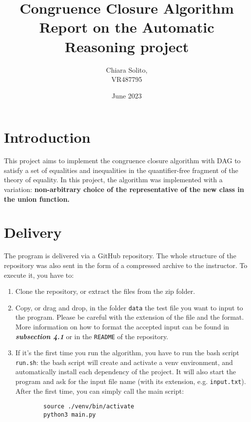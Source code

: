 \documentclass[11pt]{article}
\title{\Huge Congruence Closure Algorithm \\ \Large Report on the Automatic Reasoning project}
\date{June 2023}
\author{Chiara Solito,\\VR487795}
\begin{document}
\maketitle

\section{Introduction}
This project aims to implement the congruence closure algorithm with DAG to satisfy a set of equalities and inequalities in the quantifier-free fragment of the theory of equality. In this project, the algorithm was implemented with a variation: \textbf{non-arbitrary choice of the representative of the new class in the union function.}

\section{Delivery}
The program is delivered via a GitHub repository. The whole structure of the repository was also sent in the form of a compressed archive to the instructor. To execute it, you have to:
\begin{enumerate}
    \item Clone the repository, or extract the files from the zip folder.
    \item Copy, or drag and drop, in the folder \texttt{data} the test file you want to input to the program. Please be careful with the extension of the file and the format. \\ More information on how to format the accepted input can be found in \textit{\textbf{subsection 4.1}} or in the \texttt{README} of the repository.
    \item If it's the first time you run the algorithm, you have to run the bash script \texttt{run.sh}: the bash script will create and activate a venv environment, and automatically install each dependency of the project. It will also start the program and ask for the input file name (with its extension, e.g. \texttt{input.txt}).\\
    After the first time, you can simply call the main script:
    \begin{verbatim}
        source ./venv/bin/activate
        python3 main.py
    \end{verbatim}
    
\end{enumerate}
\end{document}
